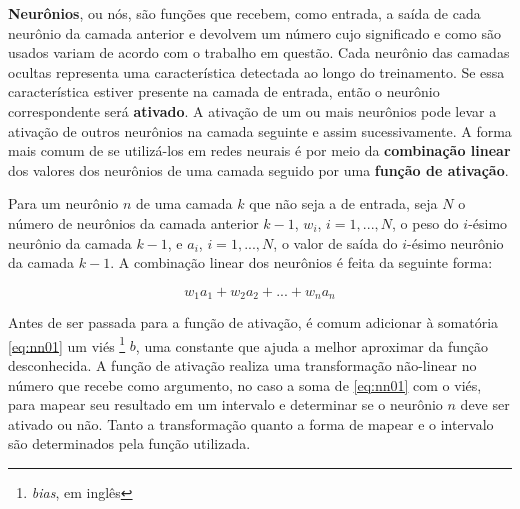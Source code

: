 \textbf{Neurônios}, ou nós, são funções que recebem, como entrada, a saída de cada neurônio da camada anterior e devolvem um número
cujo significado e como são usados variam de acordo com o trabalho em questão.
Cada neurônio das camadas ocultas representa uma característica detectada ao longo do treinamento.
Se essa característica estiver presente na camada de entrada, então o neurônio correspondente será \textbf{ativado}.
A ativação de um ou mais neurônios pode levar a ativação de outros neurônios na camada seguinte e assim sucessivamente.
A forma mais comum de se utilizá-los em redes neurais é por meio da \textbf{combinação linear} dos valores dos neurônios de uma camada seguido por uma \textbf{função de ativação}.

Para um neurônio $n$ de uma camada $k$ que não seja a de entrada, seja $N$ o número de neurônios da camada anterior $k-1$, $w_{i}$, $i = 1, ..., N$, o peso do $i$-ésimo neurônio da camada $k-1$, e $a_{i}$, $i = 1, ..., N$, o valor de saída do $i$-ésimo neurônio da camada $k-1$.
A combinação linear dos neurônios é feita da seguinte forma:

\begin{equation} \label{eq:nn01}
w_{1}a_{1} + w_{2}a_{2} + ... + w_{n}a_{n}
\end{equation}

Antes de ser passada para a função de ativação, é comum adicionar à somatória \ref{eq:nn01} um viés \footnote{\textit{bias}, em inglês} $b$, uma constante que ajuda a melhor aproximar da função desconhecida.
A função de ativação realiza uma transformação não-linear no número que recebe como argumento, no caso a soma de \ref{eq:nn01} com o viés, para mapear seu resultado em um intervalo e determinar se o neurônio $n$ deve ser ativado ou não.
Tanto a transformação quanto a forma de mapear e o intervalo são determinados pela função utilizada.

